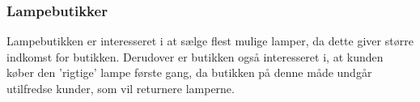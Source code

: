 \subsubsection{Lampebutikker}
Lampebutikken er interesseret i at sælge flest mulige lamper, da dette giver større indkomst for butikken. Derudover er butikken også interesseret i, at kunden køber den 'rigtige' lampe første gang, da butikken på denne måde undgår utilfredse kunder, som vil returnere lamperne.


